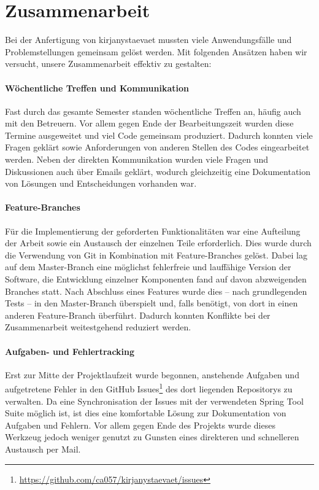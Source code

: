\section{Zusammenarbeit}

	Bei der Anfertigung von kirjanystaevaet mussten viele Anwendungsfälle und Problemstellungen gemeinsam gelöst werden. Mit folgenden Ansätzen haben wir versucht, unsere Zusammenarbeit effektiv zu gestalten:
	
	\paragraph{Wöchentliche Treffen und Kommunikation}
	Fast durch das gesamte Semester standen wöchentliche Treffen an, häufig auch mit den Betreuern. Vor allem gegen Ende der Bearbeitungszeit wurden diese Termine ausgeweitet und viel Code gemeinsam produziert. Dadurch konnten viele Fragen geklärt sowie Anforderungen von anderen Stellen des Codes eingearbeitet werden. Neben der direkten Kommunikation wurden viele Fragen und Diskussionen auch über Emails geklärt, wodurch gleichzeitig eine Dokumentation von Lösungen und Entscheidungen vorhanden war.
	
	\paragraph{Feature-Branches}
	Für die Implementierung der geforderten Funktionalitäten war eine Aufteilung der Arbeit sowie ein Austausch der einzelnen Teile erforderlich. Dies wurde durch die Verwendung von Git in Kombination mit Feature-Branches gelöst. Dabei lag auf dem Master-Branch eine möglichst fehlerfreie und lauffähige Version der Software, die Entwicklung einzelner Komponenten fand auf davon abzweigenden Branches statt. Nach Abschluss eines Features wurde dies -- nach grundlegenden Tests -- in den Master-Branch überspielt und, falls benötigt, von dort in einen anderen Feature-Branch überführt. Dadurch konnten Konflikte bei der Zusammenarbeit weitestgehend reduziert werden.
	
	\paragraph{Aufgaben- und Fehlertracking}
	Erst zur Mitte der Projektlaufzeit wurde begonnen, anstehende Aufgaben und aufgetretene Fehler in den GitHub Issues\footnote{\hyperlink{https://github.com/ca057/kirjanystaevaet/issues}{https://github.com/ca057/kirjanystaevaet/issues}} des dort liegenden Repositorys zu verwalten. Da eine Synchronisation der Issues mit der verwendeten Spring Tool Suite möglich ist, ist dies eine komfortable Lösung zur Dokumentation von Aufgaben und Fehlern. Vor allem gegen Ende des Projekts wurde dieses Werkzeug jedoch weniger genutzt zu Gunsten eines direkteren und schnelleren Austausch per Mail.